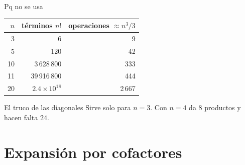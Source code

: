 \documentclass[aspectratio=169,11pt]{beamer}
\begin{document}
\begin{frame}{Pq no se usa}
  \begin{center}
    \begin{tabular}{r r r}
      \toprule
      $n$ & términos $n!$ & operaciones $\approx n^3/3$ \\
      \midrule
       3 & 6                 & 9 \\
       5 & 120               & 42 \\
      10 & 3\,628\,800       & 333 \\
      11 & 39\,916\,800      & 444 \\
      20 & $2.4\times10^{18}$ & 2\,667 \\
      \bottomrule
    \end{tabular}
  \end{center}

  \begin{alertblock}{El truco de las diagonales}
    Sirve solo para $n = 3$. Con $n = 4$ da $8$ productos y hacen
    falta $24$.
  \end{alertblock}
\end{frame}

\section{Expansión por cofactores}
\end{document}
